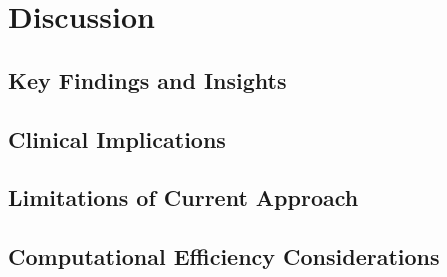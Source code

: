 
\chapter{Discussion}

\section{Key Findings and Insights}

\section{Clinical Implications}

\section{Limitations of Current Approach}

\section{Computational Efficiency Considerations}

